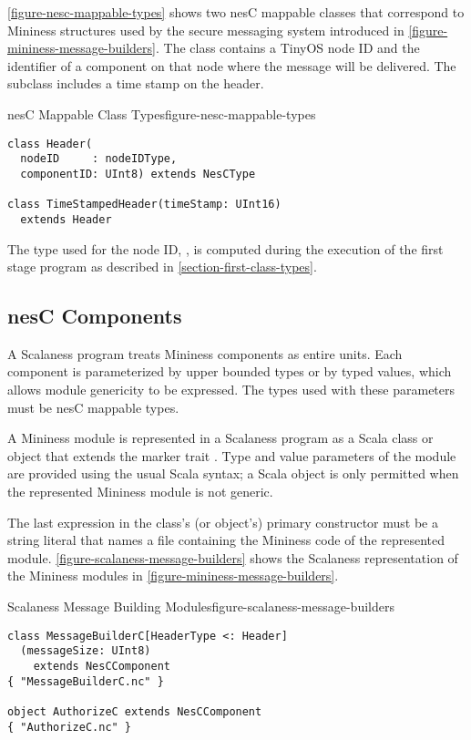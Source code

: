\autoref{figure-nesc-mappable-types} shows two nesC mappable classes
that correspond to Mininess structures used by the secure messaging
system introduced in \autoref{figure-mininess-message-builders}. The
 class contains a TinyOS node ID and the identifier of a
component on that node where the message will be delivered. The
 subclass includes a time stamp on the header.

\begin{fpfig}[tbhp]{nesC Mappable Class Types}{figure-nesc-mappable-types}
{
\begin{Verbatim}[fontsize=\small]
class Header(
  nodeID     : nodeIDType,
  componentID: UInt8) extends NesCType

class TimeStampedHeader(timeStamp: UInt16)
  extends Header
\end{Verbatim}
}
\end{fpfig}

The type used for the node ID, , is computed during
the execution of the first stage program as described in
\autoref{section-first-class-types}.

\subsection{nesC Components}
\label{section-nesc-components}

A Scalaness program treats Mininess components as entire units. Each
component is parameterized by upper bounded types or by typed values,
which allows module genericity to be expressed. The types used with
these parameters must be nesC mappable types.

A Mininess module is represented in a Scalaness program as a Scala
class or object that extends the marker trait .
Type and value parameters of the module are provided using the usual
Scala syntax; a Scala object is only permitted when the represented
Mininess module is not generic.

The last expression in the class's (or object's) primary constructor
must be a string literal that names a file containing the Mininess
code of the represented module.
\autoref{figure-scalaness-message-builders} shows the Scalaness
representation of the Mininess modules in
\autoref{figure-mininess-message-builders}.

\begin{fpfig}[tbhp]{Scalaness Message Building Modules}{figure-scalaness-message-builders}
{
\begin{Verbatim}[fontsize=\small]
class MessageBuilderC[HeaderType <: Header]
  (messageSize: UInt8)
    extends NesCComponent
{ "MessageBuilderC.nc" }

object AuthorizeC extends NesCComponent
{ "AuthorizeC.nc" }

\end{Verbatim}
}
\end{fpfig}

